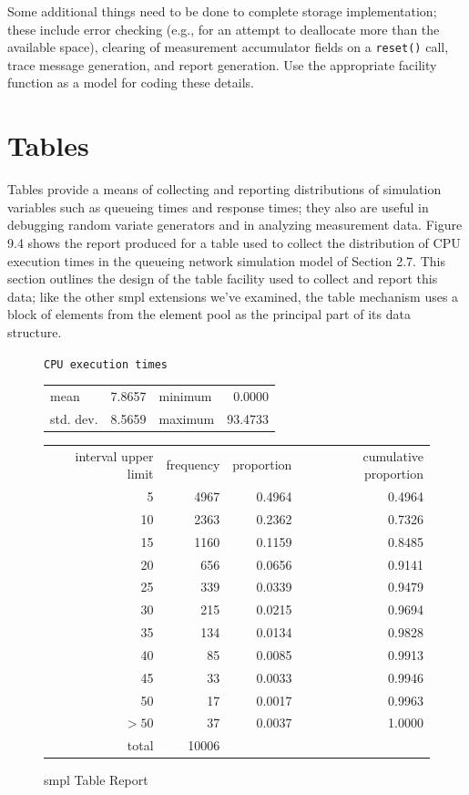 Some additional things need to be done to complete storage implementation;
these include error checking (e.g., for an attempt to deallocate more
than the available space), clearing of measurement accumulator fields on a
\texttt{reset()} call, trace message generation, and report generation. Use the
appropriate facility function as a model for coding these details.

\section{Tables}

Tables provide a means of collecting and reporting distributions of simulation
variables such as queueing times and response times; they also are
useful in debugging random variate generators and in analyzing measurement
data. Figure 9.4 shows the report produced for a table used to collect the
distribution of CPU execution times in the queueing network simulation
model of Section 2.7. This section outlines the design of the table facility
used to collect and report this data; like the other smpl extensions we've
examined, the table mechanism uses a block of elements from the element
pool as the principal part of its data structure.

\begin{figure}[htbp]
\centering
\texttt{CPU execution times}\par\medskip
\begin{tabular}{lr@{\qquad\qquad}lr}
mean & 7.8657 & minimum & 0.0000 \\
std. dev. & 8.5659 & maximum & 93.4733
\end{tabular}\par\medskip
\begin{tabular}{rrrr}
interval upper limit & frequency & proportion & cumulative proportion \\
5 & 4967 & 0.4964 & 0.4964 \\
10 & 2363 & 0.2362 & 0.7326 \\
15 & 1160 & 0.1159 & 0.8485 \\
20 & 656 & 0.0656 & 0.9141 \\
25 & 339 & 0.0339 & 0.9479 \\
30 & 215 & 0.0215 & 0.9694 \\
35 & 134 & 0.0134 & 0.9828 \\
40 & 85 & 0.0085 & 0.9913 \\
45 & 33 & 0.0033 & 0.9946 \\
50 & 17 & 0.0017 & 0.9963 \\
$>50$ & 37 & 0.0037 & 1.0000 \\
total & 10006 & &
\end{tabular}
\caption{smpl Table Report}
\end{figure}

